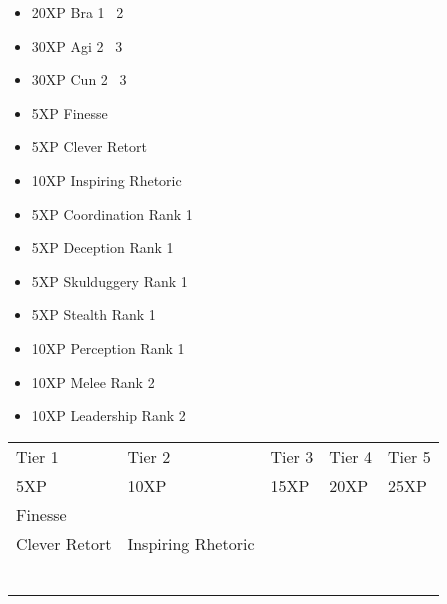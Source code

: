 \documentclass{article}
\begin{document}


\begin{multicols}{2}
\setlength{\columnseprule}{0.3pt}
\begin{itemize}[noitemsep]
\item 20XP Bra 1 \faArrowRight\ 2
\item 30XP Agi 2 \faArrowRight\ 3
\item 30XP Cun 2 \faArrowRight\ 3
\item 5XP Finesse
\item 5XP Clever Retort
\item 10XP Inspiring Rhetoric
\item 5XP Coordination Rank 1
\item 5XP Deception Rank 1
\item 5XP Skulduggery Rank 1
\item 5XP Stealth Rank 1
\item 10XP Perception Rank 1
\item 10XP Melee Rank 2
\item 10XP Leadership Rank 2
\end{itemize}
\end{multicols}


\vspace*{\fill}

\hfill{}


\pagebreak


\noindent\begin{tabu} to 
\rowfont{\bfseries\sffamily\centering} Tier 1 & Tier 2 & Tier 3 & Tier 4 & Tier 5\\
\rowfont{\small\sffamily\centering} 5XP & 10XP & 15XP & 20XP & 25XP\\
Finesse \\
Clever Retort & Inspiring Rhetoric \\
 &  & \\
 &  & & \\
 &  & & & \\
 &  & & & \\
 &  & & & \\
 &  & & & \\

\end{tabu}
\end{document}
